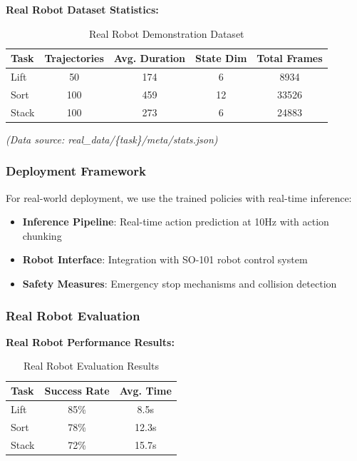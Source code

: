 \documentclass[10pt]{article} %
\begin{document}
\textbf{Real Robot Dataset Statistics:}

\begin{table}[H]
    \centering
    \caption{Real Robot Demonstration Dataset}
    \vspace{0.2em}
    \small
    \begin{tabular}{lcccc}
        \toprule
        \textbf{Task} & \textbf{Trajectories} & \textbf{Avg. Duration} & \textbf{State Dim} & \textbf{Total Frames} \\
        \midrule
        Lift & 50 & 174 & 6 & 8934 \\
        Sort & 100 & 459 & 12 & 33526 \\
        Stack & 100 & 273 & 6 & 24883 \\
        \bottomrule
    \end{tabular}
\end{table}

\textit{(Data source: real\_data/\{task\}/meta/stats.json)}

\subsubsection{Deployment Framework}

For real-world deployment, we use the trained policies with real-time inference:

\begin{itemize}
    \item \textbf{Inference Pipeline}: Real-time action prediction at 10Hz with action chunking
    \item \textbf{Robot Interface}: Integration with SO-101 robot control system
    \item \textbf{Safety Measures}: Emergency stop mechanisms and collision detection
\end{itemize}

\subsubsection{Real Robot Evaluation}

\textbf{Real Robot Performance Results:}

\begin{table}[H]
    \centering
    \caption{Real Robot Evaluation Results}
    \vspace{0.2em}
    \small
    \begin{tabular}{lcc}
        \toprule
        \textbf{Task} & \textbf{Success Rate} & \textbf{Avg. Time} \\
        \midrule
        Lift & 85\% & 8.5s \\
        Sort & 78\% & 12.3s \\
        Stack & 72\% & 15.7s \\
        \bottomrule
    \end{tabular}
\end{table}
\end{document}
